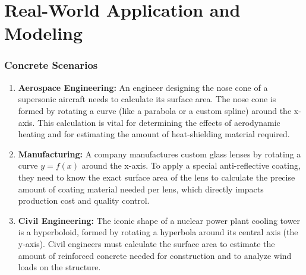 \documentclass{article}
\begin{document}
\part*{Real-World Application and Modeling}

\section{Concrete Scenarios}
\begin{enumerate}
    \item \textbf{Aerospace Engineering:} An engineer designing the nose cone of a supersonic aircraft needs to calculate its surface area. The nose cone is formed by rotating a curve (like a parabola or a custom spline) around the x-axis. This calculation is vital for determining the effects of aerodynamic heating and for estimating the amount of heat-shielding material required.
    \item \textbf{Manufacturing:} A company manufactures custom glass lenses by rotating a curve \(y=f(x)\) around the x-axis. To apply a special anti-reflective coating, they need to know the exact surface area of the lens to calculate the precise amount of coating material needed per lens, which directly impacts production cost and quality control.
    \item \textbf{Civil Engineering:} The iconic shape of a nuclear power plant cooling tower is a hyperboloid, formed by rotating a hyperbola around its central axis (the y-axis). Civil engineers must calculate the surface area to estimate the amount of reinforced concrete needed for construction and to analyze wind loads on the structure.
\end{enumerate}
\end{document}
